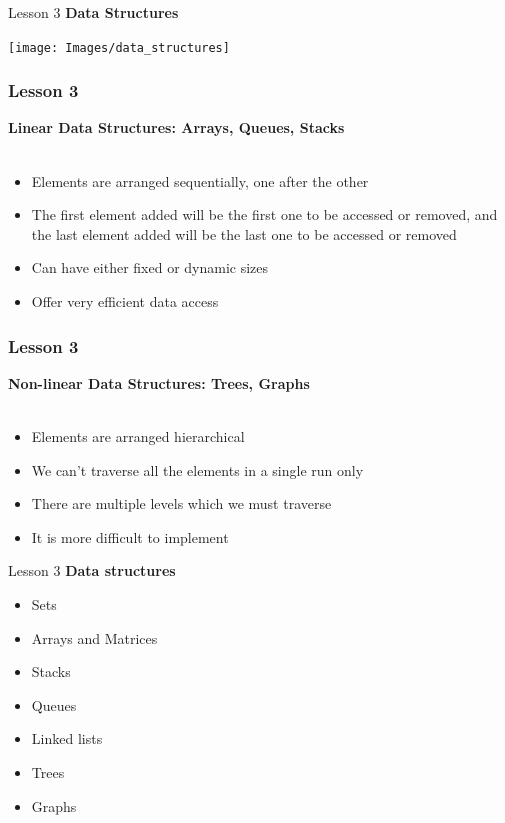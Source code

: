 \documentclass[aspectratio=1610]{beamer}
\begin{document}
\begin{frame}{Lesson 3}{}
\LARGE
\textbf{Data Structures}
\begin{center}
\texttt{[image: Images/data\_structures]}
\end{center}
\end{frame}



\begin{frame}
\frametitle{Lesson 3}
\LARGE 
\textbf{Linear Data Structures: Arrays, Queues, Stacks}\\~\\
\begin{itemize}
	\item Elements are arranged sequentially, one after the other
	\item The first element added will be the first one to be accessed or removed, and the last element added will be the last one to be accessed or removed
	\item Can have either fixed or dynamic sizes
	\item Offer very efficient data access
\end{itemize}
\end{frame}


\begin{frame}
\frametitle{Lesson 3}
\LARGE 
\textbf{Non-linear Data Structures: Trees, Graphs}\\~\\
\begin{itemize}
	\item Elements are arranged hierarchical
	\item We can’t traverse all the elements in a single run only
	\item There are multiple levels which we must traverse
	\item It is more difficult to implement
\end{itemize}
\end{frame}


\begin{frame}{Lesson 3}{}
\LARGE
\textbf{Data structures}
\begin{itemize}
    \item Sets
    \item Arrays and Matrices
    \item Stacks
    \item Queues
    \item Linked lists
    \item Trees
    \item Graphs
\end{itemize}
\end{frame}
\end{document}
